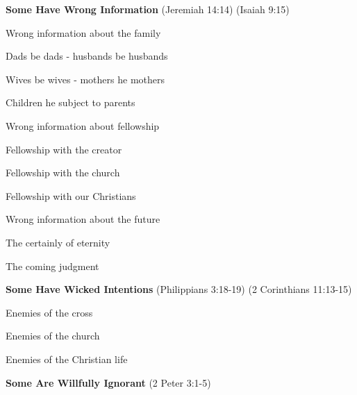 \begin{compactenum}[I.]
    \item \textbf{Some Have Wrong Information} (Jeremiah 14:14)  (Isaiah 9:15)
    \begin{compactenum}[A.]
		\item Wrong information about the family
		    \begin{compactenum}[1.]
		    	\item Dads be dads - husbands be husbands
		    	\item Wives be wives - mothers he mothers
		    	\item Children he subject to parents
		    \end{compactenum}
			\item Wrong information about fellowship 
		    \begin{compactenum}[1.]
		    	\item Fellowship with the creator 
		    	\item Fellowship with the church 
		    	\item Fellowship with our Christians
		    \end{compactenum}
		\item Wrong information about the future
		    \begin{compactenum}[1.]
		    	\item The certainly of eternity 
		    	\item The coming judgment
		    \end{compactenum}
	\end{compactenum}
    \item \textbf{Some Have Wicked Intentions}  (Philippians 3:18-19) (2 Corinthians 11:13-15) 
    \begin{compactenum}[A.]
		\item Enemies of the cross 
		\item Enemies of the church 
		\item Enemies of the Christian life		
	\end{compactenum}
    \item \textbf{Some Are Willfully Ignorant} (2 Peter 3:1-5)

\end{compactenum}
